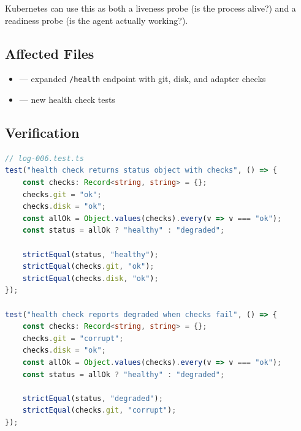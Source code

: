 Kubernetes can use this as both a liveness probe (is the process alive?) and a readiness probe (is the agent actually working?).

\subsection*{Affected Files}
\begin{itemize}
    \item {} --- expanded \texttt{/health} endpoint with git, disk, and adapter checks
    \item {} --- new health check tests
\end{itemize}

\subsection*{Verification}
\begin{lstlisting}[language=TypeScript]
// log-006.test.ts
test("health check returns status object with checks", () => {
    const checks: Record<string, string> = {};
    checks.git = "ok";
    checks.disk = "ok";
    const allOk = Object.values(checks).every(v => v === "ok");
    const status = allOk ? "healthy" : "degraded";

    strictEqual(status, "healthy");
    strictEqual(checks.git, "ok");
    strictEqual(checks.disk, "ok");
});

test("health check reports degraded when checks fail", () => {
    const checks: Record<string, string> = {};
    checks.git = "corrupt";
    checks.disk = "ok";
    const allOk = Object.values(checks).every(v => v === "ok");
    const status = allOk ? "healthy" : "degraded";

    strictEqual(status, "degraded");
    strictEqual(checks.git, "corrupt");
});
\end{lstlisting}
